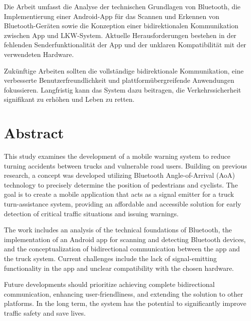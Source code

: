 \documentclass[a4paper, 12pt]{article} %
\begin{document}
    Die Arbeit umfasst die Analyse der technischen Grundlagen 
    von Bluetooth, die Implementierung einer Android-App 
    für das Scannen 
    und Erkennen von Bluetooth-Geräten sowie die Konzeption 
    einer bidirektionalen Kommunikation zwischen App und LKW-System.
     Aktuelle Herausforderungen bestehen in der fehlenden 
     Senderfunktionalität der App und der unklaren Kompatibilität 
     mit der verwendeten Hardware.
    
    Zukünftige Arbeiten sollten die vollständige bidirektionale 
    Kommunikation, eine verbesserte Benutzerfreundlichkeit und
    plattformübergreifende Anwendungen fokussieren. Langfristig kann das System dazu beitragen, die Verkehrssicherheit signifikant zu erhöhen und Leben zu retten.
\section*{Abstract}
\begin{spacing}{1.8}  %
    \fontsize{14pt}{14pt}\selectfont  %
    This study examines the development of a mobile warning system to reduce turning accidents between trucks and vulnerable road users. Building on previous research, a concept was developed utilizing Bluetooth Angle-of-Arrival (AoA) technology 
    to precisely determine the position of pedestrians and cyclists.
    The goal is to create a mobile application that acts as a signal 
    emitter for a truck turn-assistance system, providing an affordable
     and accessible solution for early detection of critical traffic 
     situations and issuing warnings.

    The work includes an analysis of the technical 
    foundations of Bluetooth, the implementation of an Android 
    app for scanning and detecting Bluetooth devices, 
    and the conceptualization of bidirectional communication
     between the app and the truck system. Current challenges 
     include the lack of signal-emitting functionality in the app 
     and unclear compatibility with the chosen hardware.
    
    Future developments should prioritize achieving complete 
    bidirectional communication, enhancing user-friendliness, 
    and extending the solution to other platforms. In the long term,
     the system has the potential to significantly improve traffic safety
      and save lives.

\end{spacing}
\clearpage
\end{document}
